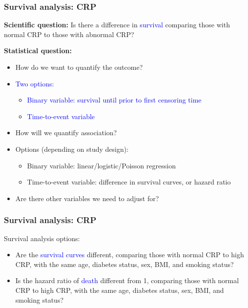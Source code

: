 \documentclass[12pt, 
hyperref={colorlinks=true, linkcolor=blue, urlcolor=cyan},dvipsnames]{beamer}
\begin{document}
\begin{frame}[noframenumbering]
\frametitle{Survival analysis: CRP}
\textbf{Scientific question:} Is there \textcolor{BurntOrange}{a difference} in \textcolor{blue}{survival} comparing those with normal CRP to those with abnormal CRP?

\textbf{Statistical question:} \vspace{-0.3cm}
\begin{itemize}
\item How do we want to quantify the outcome?
\item[] \textcolor{blue}{Two options:}
\begin{itemize}
\item \textcolor{blue}{Binary variable: survival until prior to first censoring time}
\item \textcolor{blue}{Time-to-event variable}
\end{itemize}
\item How will we quantify association?
\item[] \textcolor{BurntOrange}{Options (depending on study design):}
\begin{itemize}
\item \textcolor{BurntOrange}{Binary variable: linear/logistic/Poisson regression}
\item \textcolor{BurntOrange}{Time-to-event variable: difference in survival curves, or hazard ratio}
\end{itemize}
\item Are there other variables we need to adjust for?
\end{itemize}
\end{frame}

\begin{frame}
\frametitle{Survival analysis: CRP}
Survival analysis options:
\begin{itemize}
\item Are the \textcolor{blue}{survival curves}  \textcolor{BurntOrange}{different}, comparing those with normal CRP to high CRP, with the same \textcolor{BurntOrange}{age, diabetes status, sex, BMI, and smoking status?}
\item Is the \textcolor{BurntOrange}{hazard ratio} of \textcolor{blue}{death} different from 1, comparing those with normal CRP to high CRP, with the same \textcolor{BurntOrange}{age, diabetes status, sex, BMI, and smoking status}?
\end{itemize}
\end{frame}
\end{document}

